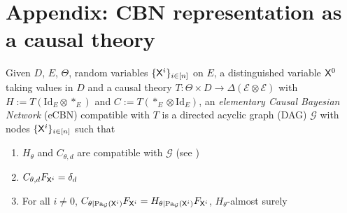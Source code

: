 
\section{Appendix: CBN representation as a causal theory}\label{sec:cbn_as_ct}

\begin{definition}

Given $D$, $E$, $\Theta$, random variables $\{\mathsf{X}^i\}_{i\in [n]}$ on $E$, a distinguished variable $\mathsf{X}^0$ taking values in $D$ and a causal theory $T:\Theta\times D\to \Delta(\mathcal{E}\otimes\mathcal{E})$ with $H:= T(\mathrm{Id}_E\otimes *_E)$ and $C:= T(*_E\otimes \mathrm{Id}_E)$, an \emph{elementary Causal Bayesian Network} (eCBN) compatible with $T$ is a directed acyclic graph (DAG) $\mathcal{G}$ with nodes $\{\mathsf{X}^i\}_{i\in [n]}$ such that

\begin{enumerate}
    \item $H_\theta$ and $C_{\theta,d}$ are compatible with $\mathcal{G}$ (see \citet{pearl_causality:_2009})
    \item $C_{\theta,d} F_{\mathsf{X}^i}=\delta_{d}$
    \item For all $i\neq 0$, $C_{\theta|\text{Pa}_{\mathcal{G}}(\mathsf{X}^i)} F_{\mathsf{X}^i}=H_{\theta|\text{Pa}_{\mathcal{G}}(\mathsf{X}^i)}F_{\mathsf{X}^i} $, $H_\theta$-almost surely
\end{enumerate}
\end{definition}